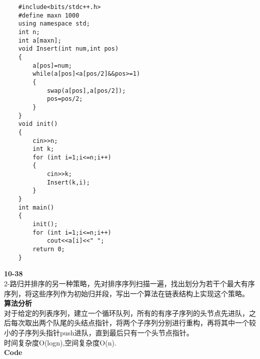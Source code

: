 \documentclass[UTF8,a4paper]{article}
\begin{document}
\begin{lstlisting}
    #include<bits/stdc++.h>
    #define maxn 1000
    using namespace std;
    int n;
    int a[maxn];
    void Insert(int num,int pos)
    {
        a[pos]=num;
        while(a[pos]<a[pos/2]&&pos>=1) 
        {
            swap(a[pos],a[pos/2]);
            pos=pos/2;
        }
    }
    void init()
    {
        cin>>n;
        int k;
        for (int i=1;i<=n;i++)
        {
            cin>>k;
            Insert(k,i);
        }
    }
    int main()
    {
        init();    
        for (int i=1;i<=n;i++)
            cout<<a[i]<<" ";
        return 0;
    }    
\end{lstlisting}
\textbf{10-38}\\
2-路归并排序的另一种策略，先对排序序列扫描一遍，找出划分为若干个最大有序序列，将这些序列作为初始归并段，写出一个算法在链表结构上实现这个策略。\\
\textbf{算法分析}\\
对于给定的列表序列，建立一个循环队列，所有的有序子序列的头节点先进队，之后每次取出两个队尾的头结点指针，将两个子序列分别进行重构，再将其中一个较小的子序列头指针push进队，直到最后只有一个头节点指针。\\
时间复杂度O(logn),空间复杂度O(n).\\
\textbf{Code}
\end{document}
